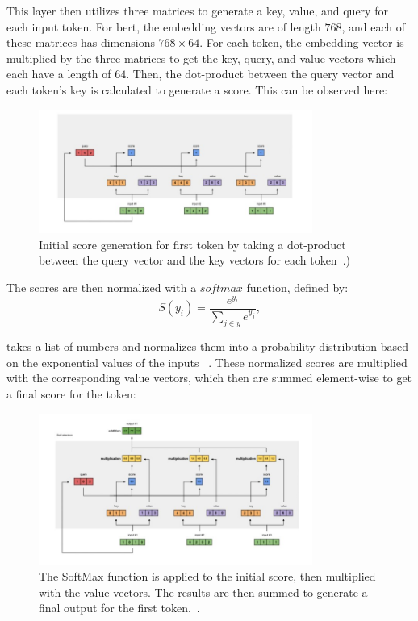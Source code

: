 This layer then utilizes three matrices to generate a key, value, and query for each input token. For \acrshort{bert}, the embedding vectors are of length $768$, and each of these matrices has dimensions $768 \times 64$. For each token, the embedding vector is multiplied by the three matrices to get the key, query, and value vectors which each have a length of $64$. Then, the dot-product between the query vector and each token’s key is calculated to generate a score. This can be observed here:

\begin{figure}[h]
\centering
\includegraphics[width=0.8\textwidth]{fig/first_encoder_step.jpg}
\caption{Initial score generation for first token by taking a dot-product between the query vector and the key vectors for each token~\parencite{karim_2019}.)
}
\label{fig:first_encoder_step}
\end{figure}

The scores are then normalized with a $softmax$ function, defined by:
\begin{equation}
\label{eq:softmax}
S(y_i) = \frac{e^{y_i}}{\sum_{j\in y}e^{y_j}}, 
\end{equation}

 takes a list of numbers and normalizes them into a probability distribution based on the exponential values of the inputs ~\parencite{bengio_goodfellow_courville_2017}. These normalized scores are multiplied with the corresponding value vectors, which then are summed element-wise to get a final score for the token:

\begin{figure}[H]
\centering
\includegraphics[width=0.8\textwidth]{fig/second_encoder_step.jpg}
\caption{The SoftMax function is applied to the initial score, then multiplied with the value vectors. The results are then summed to generate a final output for the first token.~\parencite{karim_2019}.
}
\label{fig:second_encoder_step}
\end{figure}

